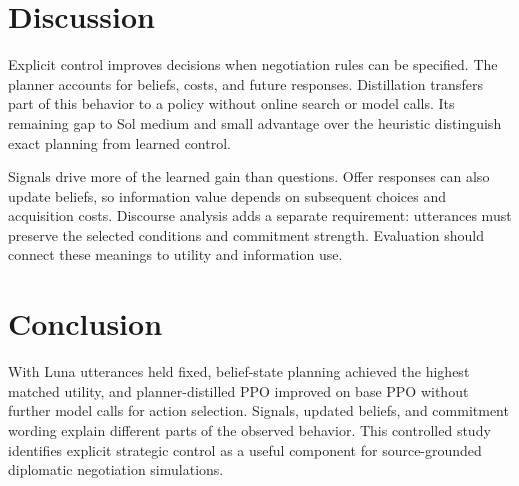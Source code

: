 \section{Discussion}
Explicit control improves decisions when negotiation rules can be specified. The planner accounts for beliefs, costs, and future responses. Distillation transfers part of this behavior to a policy without online search or model calls. Its remaining gap to Sol medium and small advantage over the heuristic distinguish exact planning from learned control.

Signals drive more of the learned gain than questions. Offer responses can also update beliefs, so information value depends on subsequent choices and acquisition costs. Discourse analysis adds a separate requirement: utterances must preserve the selected conditions and commitment strength. Evaluation should connect these meanings to utility and information use.

\section{Conclusion}
With Luna utterances held fixed, belief-state planning achieved the highest matched utility, and planner-distilled PPO improved on base PPO without further model calls for action selection. Signals, updated beliefs, and commitment wording explain different parts of the observed behavior. This controlled study identifies explicit strategic control as a useful component for source-grounded diplomatic negotiation simulations.
